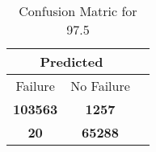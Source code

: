 \begin{table}[] 
\caption{Confusion Matric for 97.5} 
\label{Table: Prediction Accuracy-DMD97.5OnlySunEKF-combinationReflectionEKF-top2perfectNoFailurePrediction-Reflection} 
\centering 
\begin{tabular} 
 {@{}ccc@{}} 
\toprule 
\multicolumn{2}{c}{\textbf{Predicted}}
 \\ \midrule 
\multicolumn{1}{|c|}{Failure} & 
\multicolumn{1}{c|}{No Failure}
 \\ \midrule 
\multicolumn{1}{|c|}{\color{green}\textbf{103563}} & 
\multicolumn{1}{c|}{\color{red}\textbf{1257}}
 \\ \midrule 
\multicolumn{1}{|c|}{\color{red}\textbf{20}} & 
\multicolumn{1}{c|}{\color{green}\textbf{65288}}
 \\ \bottomrule 
\end{tabular} 
\end{table} 
